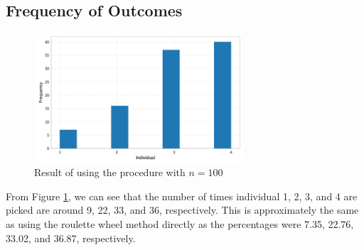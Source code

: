 \subsection{Frequency of Outcomes}

\begin{figure}[h]
    \centering
    \includegraphics[width=0.69\textwidth]{../images/p1/roulette_histogram.png}
    \caption{Result of using the procedure with \(n=100\)}
    \label{fig:roulette-outcome}
\end{figure}

From Figure \ref{fig:roulette-outcome}, we can see that the number of times individual 1, 2, 3, and 4 are picked are around 9, 22, 33, and 36, respectively. This is approximately the same as using the roulette wheel method directly as the percentages were 7.35, 22.76, 33.02, and 36.87, respectively.
